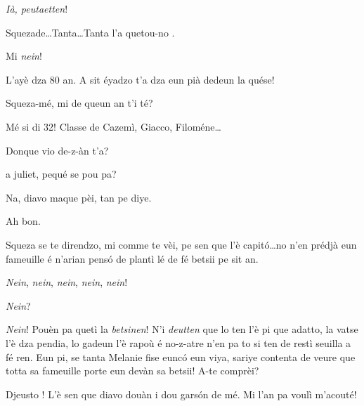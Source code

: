 \begin{drama}
\Peterspeaks{} \textit{Ià, peutaetten}!

\scene[-- R.I.P. Tanta]


\Cesarspeaks{} Squezade\ldots Tanta\ldots Tanta l’a quetou-no \plaoue.

\Hermannspeaks Mi \textit{nein}!


\Battistaspeaks{}  L’ayè dza 80 an. A sit éyadzo t’a dza eun pià dedeun la quése!


\Hermannspeaks{} Squeza-mé, mi de queun an t'i té?

\Battistaspeaks Mé si di 32! Classe de Cazemì, Giacco, Filoméne\ldots

\Hermannspeaks Donque vio de-z-àn t’a?

 a juliet, pequé se pou pa?

\Hermannspeaks Na, diavo maque pèi, tan pe diye.

\Battistaspeaks Ah bon.

\Cesarspeaks{} Squeza se te direndzo, mi comme te vèi, pe sen que l'è capit\'o\ldots no n'en prédjà eun fameuille é n'arian pens\'o de plantì lé de fé betsii pe sit an.


\Hermannspeaks \textit{Nein}, \textit{nein}, \textit{nein}, \textit{nein}, \textit{nein}!

\Cesarspeaks{} \textit{Nein}?

\Hermannspeaks{} \textit{Nein}! Pouèn pa quetì la \textit{betsinen}! N'i \textit{deutten} que lo ten l'è pi que adatto, la vatse l'è dza pendia, lo gadeun l'è rapoù é no-z-atre n'en pa to si ten de restì seuilla a fé ren. Eun pi, se tanta Melanie fise eunc\'o eun viya, sariye contenta de veure que totta sa fameuille porte eun devàn sa betsii!  A-te comprèi?

\Cesarspeaks{} Djeusto \imbarazzatoo ! L'è sen que diavo douàn i dou gars\'on de mé. Mi l'an pa voulì m'acouté!


\end{drama}
